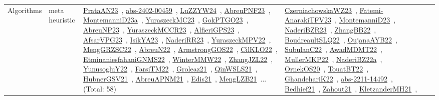 {\begin{longtable}{lp{3cm}>{\raggedright\arraybackslash}p{6cm}>{\raggedright\arraybackslash}p{6cm}>{\raggedright\arraybackslash}p{8cm}}
\index{meta heuristic}\index{Algorithms!meta heuristic}Algorithms & meta heuristic & \href{../works/PrataAN23.pdf}{PrataAN23}~\cite{PrataAN23}, \href{../works/abs-2402-00459.pdf}{abs-2402-00459}~\cite{abs-2402-00459}, \href{../works/LuZZYW24.pdf}{LuZZYW24}~\cite{LuZZYW24}, \href{../works/AbreuPNF23.pdf}{AbreuPNF23}~\cite{AbreuPNF23}, \href{../works/MontemanniD23a.pdf}{MontemanniD23a}~\cite{MontemanniD23a}, \href{../works/YuraszeckMC23.pdf}{YuraszeckMC23}~\cite{YuraszeckMC23}, \href{../works/GokPTGO23.pdf}{GokPTGO23}~\cite{GokPTGO23}, \href{../works/AbreuNP23.pdf}{AbreuNP23}~\cite{AbreuNP23}, \href{../works/YuraszeckMCCR23.pdf}{YuraszeckMCCR23}~\cite{YuraszeckMCCR23}, \href{../works/AlfieriGPS23.pdf}{AlfieriGPS23}~\cite{AlfieriGPS23}, \href{../works/AfsarVPG23.pdf}{AfsarVPG23}~\cite{AfsarVPG23}, \href{../works/IsikYA23.pdf}{IsikYA23}~\cite{IsikYA23}, \href{../works/NaderiRR23.pdf}{NaderiRR23}~\cite{NaderiRR23}, \href{../works/YuraszeckMPV22.pdf}{YuraszeckMPV22}~\cite{YuraszeckMPV22}, \href{../works/MengGRZSC22.pdf}{MengGRZSC22}~\cite{MengGRZSC22}, \href{../works/AbreuN22.pdf}{AbreuN22}~\cite{AbreuN22}, \href{../works/ArmstrongGOS22.pdf}{ArmstrongGOS22}~\cite{ArmstrongGOS22}, \href{../works/CilKLO22.pdf}{CilKLO22}~\cite{CilKLO22}, \href{../works/EtminaniesfahaniGNMS22.pdf}{EtminaniesfahaniGNMS22}~\cite{EtminaniesfahaniGNMS22}, \href{../works/WinterMMW22.pdf}{WinterMMW22}~\cite{WinterMMW22}, \href{../works/ZhangJZL22.pdf}{ZhangJZL22}~\cite{ZhangJZL22}, \href{../works/YunusogluY22.pdf}{YunusogluY22}~\cite{YunusogluY22}, \href{../works/FarsiTM22.pdf}{FarsiTM22}~\cite{FarsiTM22}, \href{../works/Groleaz21.pdf}{Groleaz21}~\cite{Groleaz21}, \href{../works/QinWSLS21.pdf}{QinWSLS21}~\cite{QinWSLS21}, \href{../works/HubnerGSV21.pdf}{HubnerGSV21}~\cite{HubnerGSV21}, \href{../works/AbreuAPNM21.pdf}{AbreuAPNM21}~\cite{AbreuAPNM21}, \href{../works/Edis21.pdf}{Edis21}~\cite{Edis21}, \href{../works/MengLZB21.pdf}{MengLZB21}~\cite{MengLZB21}... (Total: 58) & \href{../works/CzerniachowskaWZ23.pdf}{CzerniachowskaWZ23}~\cite{CzerniachowskaWZ23}, \href{../works/Fatemi-AnarakiTFV23.pdf}{Fatemi-AnarakiTFV23}~\cite{Fatemi-AnarakiTFV23}, \href{../works/MontemanniD23.pdf}{MontemanniD23}~\cite{MontemanniD23}, \href{../works/NaderiBZR23.pdf}{NaderiBZR23}~\cite{NaderiBZR23}, \href{../works/ZhangBB22.pdf}{ZhangBB22}~\cite{ZhangBB22}, \href{../works/BoudreaultSLQ22.pdf}{BoudreaultSLQ22}~\cite{BoudreaultSLQ22}, \href{../works/OujanaAYB22.pdf}{OujanaAYB22}~\cite{OujanaAYB22}, \href{../works/SubulanC22.pdf}{SubulanC22}~\cite{SubulanC22}, \href{../works/AwadMDMT22.pdf}{AwadMDMT22}~\cite{AwadMDMT22}, \href{../works/MullerMKP22.pdf}{MullerMKP22}~\cite{MullerMKP22}, \href{../works/NaderiBZ22a.pdf}{NaderiBZ22a}~\cite{NaderiBZ22a}, \href{../works/OrnekOS20.pdf}{OrnekOS20}~\cite{OrnekOS20}, \href{../works/TouatBT22.pdf}{TouatBT22}~\cite{TouatBT22}, \href{../works/GhandehariK22.pdf}{GhandehariK22}~\cite{GhandehariK22}, \href{../works/abs-2211-14492.pdf}{abs-2211-14492}~\cite{abs-2211-14492}, \href{../works/Bedhief21.pdf}{Bedhief21}~\cite{Bedhief21}, \href{../works/Zahout21.pdf}{Zahout21}~\cite{Zahout21}, \href{../works/KletzanderMH21.pdf}{KletzanderMH21}~\cite{KletzanderMH21}, 
\end{longtable}}
